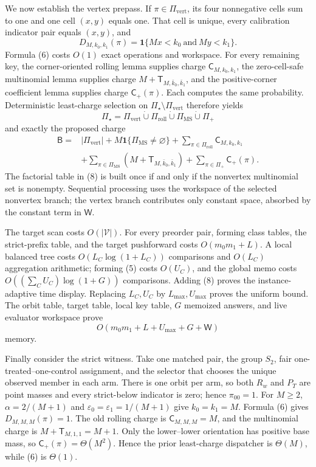 We now establish the vertex prepass. If \(\pi\in\Pi_{\mathrm{vert}}\), its four nonnegative cells sum to one and one cell \((x,y)\) equals one. That cell is unique, every calibration indicator pair equals \((x,y)\), and
\[
D_{M,k_0,k_1}(\pi)=\mathbf 1\{Mx<k_0\ \text{and}\ My<k_1\}.
\tag{6}
\]
Formula (6) costs \(O(1)\) exact operations and workspace. For every remaining key, the corner-oriented rolling lemma supplies charge \(\mathsf C_{M,k_0,k_1}\), the zero-cell-safe multinomial lemma supplies charge \(M+\mathsf T_{M,\bar k_0,\bar k_1}\), and the positive-corner coefficient lemma supplies charge \(\mathsf C_+(\pi)\). Each computes the same probability. Deterministic least-charge selection on \(\Pi_\star\setminus\Pi_{\mathrm{vert}}\) therefore yields
\[
\Pi_\star=\Pi_{\mathrm{vert}}\mathbin{\dot\cup}\Pi_{\mathrm{roll}}\mathbin{\dot\cup}\Pi_{\mathrm{MS}}\mathbin{\dot\cup}\Pi_+
\tag{7}
\]
and exactly the proposed charge
\[
\begin{aligned}
\mathsf B={}&|\Pi_{\mathrm{vert}}|+M\mathbf 1\{\Pi_{\mathrm{MS}}\ne\varnothing\}
+\sum_{\pi\in\Pi_{\mathrm{roll}}}\mathsf C_{M,k_0,k_1}\\
&+\sum_{\pi\in\Pi_{\mathrm{MS}}}(M+\mathsf T_{M,\bar k_0,\bar k_1})
+\sum_{\pi\in\Pi_+}\mathsf C_+(\pi).
\end{aligned}
\tag{8}
\]
The factorial table in (8) is built once if and only if the nonvertex multinomial set is nonempty. Sequential processing uses the workspace of the selected nonvertex branch; the vertex branch contributes only constant space, absorbed by the constant term in \(\mathsf W\).

The target scan costs \(O(|\mathcal V|)\). For every preorder pair, forming class tables, the strict-prefix table, and the target pushforward costs \(O(m_0m_1+L)\). A local balanced tree costs \(O(L_C\log(1+L_C))\) comparisons and \(O(L_C)\) aggregation arithmetic; forming (5) costs \(O(U_C)\), and the global memo costs \(O((\sum_CU_C)\log(1+G))\) comparisons. Adding (8) proves the instance-adaptive time display. Replacing \(L_C,U_C\) by \(L_{\max},U_{\max}\) proves the uniform bound. The orbit table, target table, local key table, \(G\) memoized answers, and live evaluator workspace prove
\[
O(m_0m_1+L+U_{\max}+G+\mathsf W)
\]
memory.

Finally consider the strict witness. Take one matched pair, the group \(S_2\), fair one-treated--one-control assignment, and the selector that chooses the unique observed member in each arm. There is one orbit per arm, so both \(R_w\) and \(P_T\) are point masses and every strict-below indicator is zero; hence \(\pi_{00}=1\). For \(M\ge2\), \(\alpha=2/(M+1)\) and \(\varepsilon_0=\varepsilon_1=1/(M+1)\) give \(k_0=k_1=M\). Formula (6) gives \(D_{M,M,M}(\pi)=1\). The old rolling charge is \(\mathsf C_{M,M,M}=M\), and the multinomial charge is \(M+\mathsf T_{M,1,1}=M+1\). Only the lower--lower orientation has positive base mass, so \(\mathsf C_+(\pi)=\Theta(M^2)\). Hence the prior least-charge dispatcher is \(\Theta(M)\), while (6) is \(\Theta(1)\).